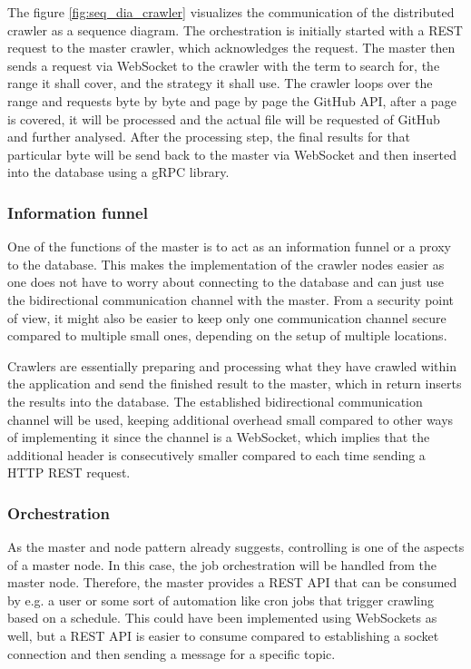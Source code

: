 The figure \ref{fig:seq_dia_crawler} visualizes the communication of the distributed crawler as a sequence diagram. The orchestration is initially started with a REST request to the master crawler, which acknowledges the request. The master then sends a request via WebSocket to the crawler with the term to search for, the range it shall cover, and the strategy it shall use. The crawler loops over the range and requests byte by byte and page by page the GitHub API, after a page is covered, it will be processed and the actual file will be requested of GitHub and further analysed. After the processing step, the final results for that particular byte will be send back to the master via WebSocket and then inserted into the database using a gRPC library.

\subsubsection{Information funnel}
\label{sec:informationfunnel}
One of the functions of the master is to act as an information funnel or a proxy to the database. This makes the implementation of the crawler nodes easier as one does not have to worry about connecting to the database and can just use the bidirectional communication channel with the master. From a security point of view, it might also be easier to keep only one communication channel secure compared to multiple small ones, depending on the setup of multiple locations.

Crawlers are essentially preparing and processing what they have crawled within the application and send the finished result to the master, which in return inserts the results into the database. The established bidirectional communication channel will be used, keeping additional overhead small compared to other ways of implementing it since the channel is a WebSocket, which implies that the additional header is consecutively smaller compared to each time sending a HTTP REST request.

\subsubsection{Orchestration}
\label{sec:orchestration}
As the master and node pattern already suggests, controlling is one of the aspects of a master node. In this case, the job orchestration will be handled from the master node. Therefore, the master provides a REST API that can be consumed by e.g. a user or some sort of automation like cron jobs that trigger crawling based on a schedule. This could have been implemented using WebSockets as well, but a REST API is easier to consume compared to establishing a socket connection and then sending a message for a specific topic.

